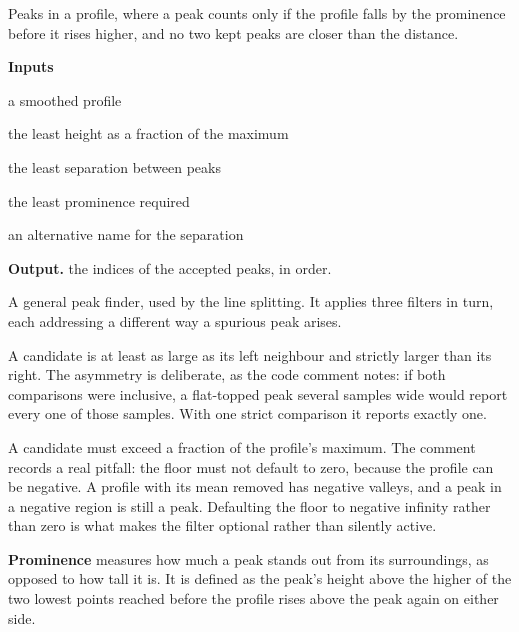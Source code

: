 Peaks in a profile, where a peak counts only if the profile falls by the prominence before it rises higher, and no two kept peaks are closer than the distance.




\noindent\textbf{Inputs}
\begin{description}[leftmargin=2.2em,style=nextline,font=\normalfont\ttfamily]\setlength\itemsep{1pt}
  \item[{sm}] \normalfont a smoothed profile
  \item[{floorFrac}] \normalfont the least height as a fraction of the maximum
  \item[{minGap}] \normalfont the least separation between peaks
  \item[{prominence}] \normalfont the least prominence required
  \item[{distance}] \normalfont an alternative name for the separation
\end{description}

\noindent\textbf{Output.} the indices of the accepted peaks, in order.


A general peak finder, used by the line splitting. It applies three filters in turn, each addressing a different way a spurious peak arises.


A candidate is at least as large as its left neighbour and strictly larger than its right. The asymmetry is deliberate, as the code comment notes: if both comparisons were inclusive, a flat-topped peak several samples wide would report every one of those samples. With one strict comparison it reports exactly one.


A candidate must exceed a fraction of the profile's maximum. The comment records a real pitfall: the floor must not default to zero, because the profile can be negative. A profile with its mean removed has negative valleys, and a peak in a negative region is still a peak. Defaulting the floor to negative infinity rather than zero is what makes the filter optional rather than silently active.


\textbf{Prominence} measures how much a peak stands out from its surroundings, as opposed to how tall it is. It is defined as the peak's height above the higher of the two lowest points reached before the profile rises above the peak again on either side.


